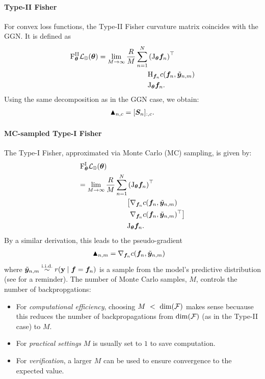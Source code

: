 \paragraph{Type-II Fisher}
For convex loss functions, the Type-II Fisher curvature matrix coincides with the GGN. It is defined as
\begin{align*}
\mathrm{F}^{\text{II}}_{{\bm{\theta}}} {\mathcal{L}}_{{\mathbb{D}}}({\bm{\theta}}) = \lim_{M \to \infty} \frac{R}{M} \sum_{n=1}^N & \left(\mathrm{J}_{{\bm{\theta}}} {\bm{f}}_n\right)^{\top} \\
&\mathrm{H}_{{\bm{f}}_n} c({\bm{f}}_n, \tilde{{\bm{y}}}_{n,m}) \\
&\mathrm{J}_{{\bm{\theta}}} {\bm{f}}_n.
\end{align*}
Using the same decomposition as in the GGN case, we obtain:
\begin{align*}
  \blacktriangle_{n,c} = [{\bm{S}}_n]_{:,c}.
\end{align*}

\paragraph{MC-sampled Type-I Fisher}
The Type-I Fisher, approximated via Monte Carlo (MC) sampling, is given by:
\begin{align*}
&\mathrm{F}^{\text{I}}_{{\bm{\theta}}}{\mathcal{L}}_{{\mathbb{D}}}({\bm{\theta}}) \\
&\begin{aligned}
= \lim_{M \to \infty} \frac{R}{M} \sum_{n=1}^N
  &\left( \mathrm{J}_{{\bm{\theta}}} {\bm{f}}_n\right)^{\top} \\
  &
\begin{aligned}
  \big[ 
  &\nabla_{{\bm{f}}_n} c({\bm{f}}_n, \tilde{{\bm{y}}}_{n,m}) \\
  &\nabla_{{\bm{f}}_n} c({\bm{f}}_n, \tilde{{\bm{y}}}_{n,m})^{\top}
  \big] 
\end{aligned} \\
  &\mathrm{J}_{{\bm{\theta}}} {\bm{f}}_n.
\end{aligned}
\end{align*}
By a similar derivation, this leads to the pseudo-gradient
\begin{align*}
  \blacktriangle_{n,m}
  &= \nabla_{{\bm{f}}_n}  c({\bm{f}}_n, \tilde{{\bm{y}}}_{n,m})
\end{align*}
where $\tilde{\vy}_{n,m} \stackrel{\text{\iid}}{\sim} r(\rvy \mid \vf = \vf_n)$ is a sample from the model's predictive distribution (see  for a reminder).
The number of Monte Carlo samples, $M$, controls the number of backpropgations:
\begin{itemize}
 \item For \emph{computational efficiency}, choosing $M~<~\dim({\mathcal{F}})$ makes sense becuause this reduces the number of backpropagations from $\dim({\mathcal{F}})$ (as in the Type-II case) to $M$.
 \item For \emph{practical settings} $M$ is usually set to $1$ to save computation.
 \item For \emph{verification}, a larger $M$ can be used to ensure convergence to the expected value.
\end{itemize}

